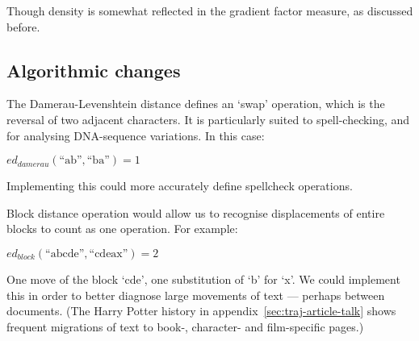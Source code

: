 Though density is somewhat reflected in the gradient factor measure,
as discussed before.

\subsection*{Algorithmic changes}
The Damerau-Levenshtein distance defines an `swap' operation, which is
the reversal of two adjacent characters. It is particularly suited to
spell-checking, and for analysing DNA-sequence variations. In this
case:

$ed_{damerau}(\text{``ab''},\text{``ba''}) = 1$

Implementing this could more accurately define spellcheck operations.

Block distance operation would allow us to recognise displacements of
entire blocks to count as one operation. For
example:

$ed_{block}(\text{``abcde''},\text{``cdeax''})= 2$

One move of the block `cde', one substitution of `b' for
`x'.\cite{Tichy1984} We could implement this in order to better
diagnose large movements of text --- perhaps between documents. (The
Harry Potter history in appendix~\ref{sec:traj-article-talk} shows
frequent migrations of text to book-, character- and film-specific
pages.)
